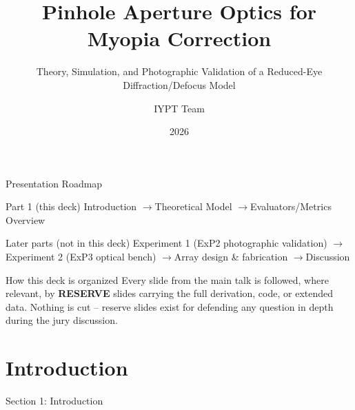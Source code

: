 \documentclass[aspectratio=169]{beamer}
\title{Pinhole Aperture Optics for Myopia Correction}
\subtitle{Theory, Simulation, and Photographic Validation of a Reduced-Eye Diffraction/Defocus Model}
\author{IYPT Team}
\date{2026}
\begin{document}
\begin{frame}
  \titlepage
\end{frame}

\begin{frame}{Presentation Roadmap}
  \begin{block}{Part 1 (this deck)}
    Introduction \quad$\to$\quad Theoretical Model \quad$\to$\quad Evaluators/Metrics Overview
  \end{block}
  \vspace{0.3cm}
  \begin{block}{Later parts (not in this deck)}
    Experiment 1 (ExP2 photographic validation) \quad$\to$\quad Experiment 2 (ExP3 optical bench)
    \quad$\to$\quad Array design \& fabrication \quad$\to$\quad Discussion
  \end{block}
  \vspace{0.5cm}
  \begin{alertblock}{How this deck is organized}
    Every slide from the main talk is followed, where relevant, by \textcolor{reserveorange}{\textbf{RESERVE}}
    slides carrying the full derivation, code, or extended data. Nothing is cut --
    reserve slides exist for defending any question in depth during the jury discussion.
  \end{alertblock}
\end{frame}

\section{Introduction}

\begin{frame}{Section 1: Introduction}
  \tableofcontents[currentsection]
\end{frame}
\end{document}
